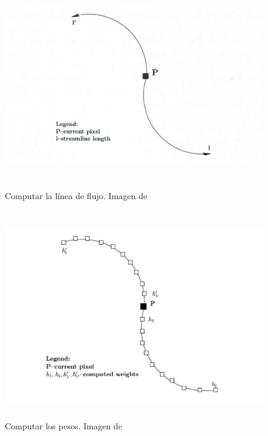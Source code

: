 \begin{figure}
		\centering
		\includegraphics[height=9cm]{figures/licstreamline.png}
		\caption{Computar la línea de flujo. Imagen de~\citet{licthesis}}	
		\label{fig:licstreamline}
\end{figure}

\begin{figure}
		\centering
		\includegraphics[height=9cm]{figures/licweights.png}
		\caption{Computar los pesos. Imagen de~\citet{licthesis}}	
		\label{fig:licweights}
\end{figure}

